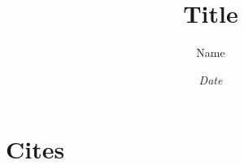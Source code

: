 \documentclass[12pt, letterpaper]{article}
\title{Title}
\author{Name}
\date{\sl{Date}}
\begin{document}
\maketitle
\newpage

\tableofcontents
\newpage

\section{Cites}

\cite{artTest}
\cite{bookTest}
\cite{inBookTest}
\cite{WEBSITE}


\newpage
{}




\listoffigures
\listoftables
\end{document}
